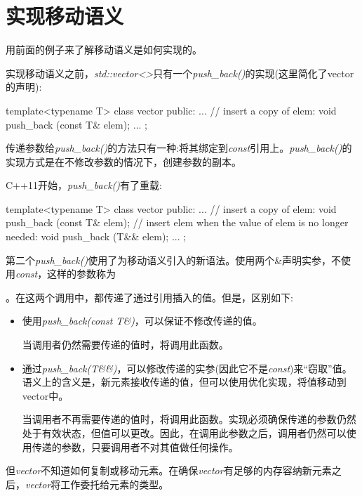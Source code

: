 \section{实现移动语义}
用前面的例子来了解移动语义是如何实现的。

实现移动语义之前，\textit{std::vector<>}只有一个\textit{push_back()}的实现(这里简化了vector的声明):

\begin{cppcode}
template<typename T>
class vector {
	public:
	...
	// insert a copy of elem:
	void push_back (const T& elem);
	...
};
\end{cppcode}

传递参数给\textit{push_back()}的方法只有一种:将其绑定到\textit{const}引用上。\textit{push_back()}的实现方式是在不修改参数的情况下，创建参数的副本。

C++11开始，\textit{push_back()}有了重载:

\begin{cppcode}
template<typename T>
class vector {
	public:
	...
	// insert a copy of elem:
	void push_back (const T& elem);
	// insert elem when the value of elem is no longer needed:
	void push_back (T&& elem);
	...
};
\end{cppcode}

第二个\textit{push_back()}使用了为移动语义引入的新语法。使用两个\&声明实参，不使用\textit{const}，这样的参数称为\begin{cppcode}
右值引用}}。只有一个\&的“普通引用”现在称为\textit{\textbf{左值引用
\end{cppcode}。在这两个调用中，都传递了通过引用插入的值。但是，区别如下:

\begin{itemize}
	\item 使用\textit{push_back(const T\&)}，可以保证不修改传递的值。

	当调用者仍然需要传递的值时，将调用此函数。
	\item 通过\textit{push_back(T\&\&)}，可以修改传递的实参(因此它不是\textit{const})来“窃取”值。语义上的含义是，新元素接收传递的值，但可以使用优化实现，将值移动到vector中。

	当调用者不再需要传递的值时，将调用此函数。实现必须确保传递的参数仍然处于有效状态，但值可以更改。因此，在调用此参数之后，调用者仍然可以使用传递的参数，只要调用者不对其值做任何操作。
\end{itemize}

但\textit{vector}不知道如何复制或移动元素。在确保\textit{vector}有足够的内存容纳新元素之后，\textit{vector}将工作委托给元素的类型。

